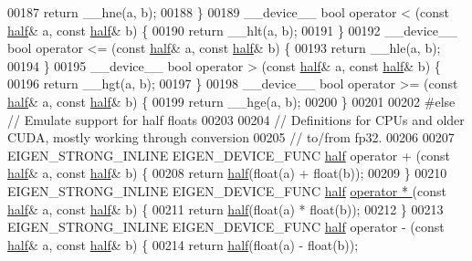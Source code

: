 \begin{DoxyCode}
00187   \textcolor{keywordflow}{return} \_\_hne(a, b);
00188 \}
00189 \_\_device\_\_ \textcolor{keywordtype}{bool} operator < (\textcolor{keyword}{const} \hyperlink{struct_eigen_1_1half}{half}& a, \textcolor{keyword}{const} \hyperlink{struct_eigen_1_1half}{half}& b) \{
00190   \textcolor{keywordflow}{return} \_\_hlt(a, b);
00191 \}
00192 \_\_device\_\_ \textcolor{keywordtype}{bool} operator <= (\textcolor{keyword}{const} \hyperlink{struct_eigen_1_1half}{half}& a, \textcolor{keyword}{const} \hyperlink{struct_eigen_1_1half}{half}& b) \{
00193   \textcolor{keywordflow}{return} \_\_hle(a, b);
00194 \}
00195 \_\_device\_\_ \textcolor{keywordtype}{bool} operator > (\textcolor{keyword}{const} \hyperlink{struct_eigen_1_1half}{half}& a, \textcolor{keyword}{const} \hyperlink{struct_eigen_1_1half}{half}& b) \{
00196   \textcolor{keywordflow}{return} \_\_hgt(a, b);
00197 \}
00198 \_\_device\_\_ \textcolor{keywordtype}{bool} operator >= (\textcolor{keyword}{const} \hyperlink{struct_eigen_1_1half}{half}& a, \textcolor{keyword}{const} \hyperlink{struct_eigen_1_1half}{half}& b) \{
00199   \textcolor{keywordflow}{return} \_\_hge(a, b);
00200 \}
00201 
00202 \textcolor{preprocessor}{#else  // Emulate support for half floats}
00203 
00204 \textcolor{comment}{// Definitions for CPUs and older CUDA, mostly working through conversion}
00205 \textcolor{comment}{// to/from fp32.}
00206 
00207 EIGEN\_STRONG\_INLINE EIGEN\_DEVICE\_FUNC \hyperlink{struct_eigen_1_1half}{half} operator + (\textcolor{keyword}{const} \hyperlink{struct_eigen_1_1half}{half}& a, \textcolor{keyword}{const} 
      \hyperlink{struct_eigen_1_1half}{half}& b) \{
00208   \textcolor{keywordflow}{return} \hyperlink{struct_eigen_1_1half}{half}(\textcolor{keywordtype}{float}(a) + \textcolor{keywordtype}{float}(b));
00209 \}
00210 EIGEN\_STRONG\_INLINE EIGEN\_DEVICE\_FUNC \hyperlink{struct_eigen_1_1half}{half} \hyperlink{namespace_eigen_a32970f7eb62fe31eeefee72d24a046d0}{operator * }(\textcolor{keyword}{const} \hyperlink{struct_eigen_1_1half}{half}& a, \textcolor{keyword}{const} 
      \hyperlink{struct_eigen_1_1half}{half}& b) \{
00211   \textcolor{keywordflow}{return} \hyperlink{struct_eigen_1_1half}{half}(\textcolor{keywordtype}{float}(a) * \textcolor{keywordtype}{float}(b));
00212 \}
00213 EIGEN\_STRONG\_INLINE EIGEN\_DEVICE\_FUNC \hyperlink{struct_eigen_1_1half}{half} operator - (\textcolor{keyword}{const} \hyperlink{struct_eigen_1_1half}{half}& a, \textcolor{keyword}{const} 
      \hyperlink{struct_eigen_1_1half}{half}& b) \{
00214   \textcolor{keywordflow}{return} \hyperlink{struct_eigen_1_1half}{half}(\textcolor{keywordtype}{float}(a) - \textcolor{keywordtype}{float}(b));

\end{DoxyCode}
